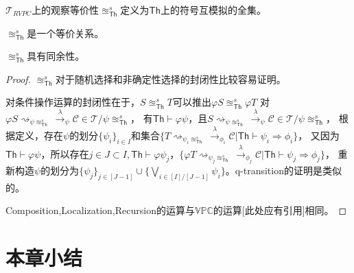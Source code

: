 \begin{definition}
   $\mathcal{T}_{RVPC}$上的观察等价性$\approxeq^s_{\mathsf{Th}}$定义为$\mathsf{Th}$上的符号互模拟的全集。
\end{definition}

\begin{theorem}
   $\approxeq^s_{\mathsf{Th}}$是一个等价关系。
\end{theorem}

\begin{theorem}
   $\approxeq^s_{\mathsf{Th}}$具有同余性。
\end{theorem}
\begin{proof}
   $\approxeq^s_{\mathsf{Th}}$对于随机选择和非确定性选择的封闭性比较容易证明。

对条件操作运算的封闭性在于，$S\approxeq^s_{\mathsf{Th}} T$可以推出$\varphi S \approxeq^s_{\mathsf{Th}} \varphi T$
对$\varphi S\rightsquigarrow_{\psi \approxeq^s_{\mathsf{Th}}}\stackrel{\lambda}{\rightarrow}_{\psi} \mathcal{C}\in \mathcal{T}/\psi \approxeq^s_{\mathsf{Th}}$，
有$\mathsf{Th}\vdash \varphi\psi$，且$S\rightsquigarrow_{\psi \approxeq^s_{\mathsf{Th}}}\stackrel{\lambda}{\rightarrow}_{\psi} \mathcal{C}\in \mathcal{T}/\psi \approxeq^s_{\mathsf{Th}}$，
根据定义，存在$\psi$的划分$\{\psi_i\}_{i\in I}$和集合$\{T\rightsquigarrow_{\psi_i \approxeq^s_{\mathsf{Th}}}\stackrel{\lambda}{\rightarrow}_{\phi_i}\mathcal{C}|\mathsf{Th}\vdash \psi_i\Rightarrow\phi_i\}$，
又因为$\mathsf{Th}\vdash \varphi\psi$，所以存在$j\in J\subset I, \mathsf{Th}\vdash \varphi\psi_j$，$\{\varphi T\rightsquigarrow_{\psi_j \approxeq^s_{\mathsf{Th}}}\stackrel{\lambda}{\rightarrow}_{\phi_j}\mathcal{C}|\mathsf{Th}\vdash \psi_j\Rightarrow\phi_j\}$，
重新构造$\psi$的划分为$\{\psi_j\}_{j\in [J-1]}\cup \{\bigvee_{i\in [I]/[J-1]}\psi_i\}$。q-transition的证明是类似的。

Composition,Localization,Recursion的运算与$\mathbb{VPC}$的运算[此处应有引用]相同。
\end{proof}

\section{本章小结}